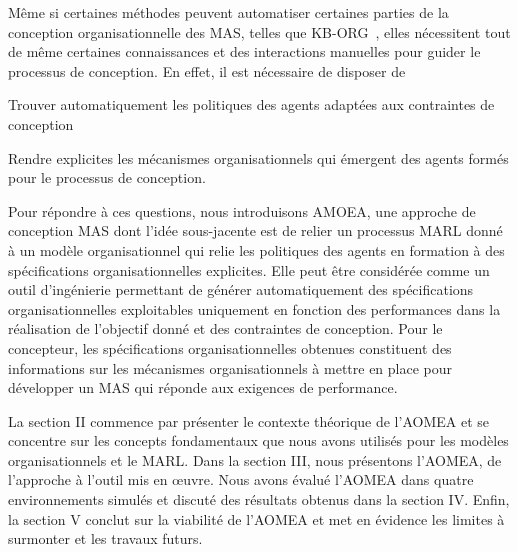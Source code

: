 Même si certaines méthodes peuvent automatiser certaines parties de la conception organisationnelle des MAS, telles que KB-ORG~\cite{Sims2008}, elles nécessitent tout de même certaines connaissances et des interactions manuelles pour guider le processus de conception. En effet, il est nécessaire de disposer de
\begin{enumerate*}[label=\roman*),itemjoin={; and \ }]
    \item Trouver automatiquement les politiques des agents adaptées aux contraintes de conception
    \item Rendre explicites les mécanismes organisationnels qui émergent des agents formés pour le processus de conception.
\end{enumerate*}


Pour répondre à ces questions, nous introduisons AMOEA, une approche de conception MAS dont l'idée sous-jacente est de relier un processus MARL donné à un modèle organisationnel qui relie les politiques des agents en formation à des spécifications organisationnelles explicites. Elle peut être considérée comme un outil d'ingénierie permettant de générer automatiquement des spécifications organisationnelles exploitables uniquement en fonction des performances dans la réalisation de l'objectif donné et des contraintes de conception. Pour le concepteur, les spécifications organisationnelles obtenues constituent des informations sur les mécanismes organisationnels à mettre en place pour développer un MAS qui réponde aux exigences de performance.



La section II commence par présenter le contexte théorique de l'AOMEA et se concentre sur les concepts fondamentaux que nous avons utilisés pour les modèles organisationnels et le MARL.
Dans la section III, nous présentons l'AOMEA, de l'approche à l'outil mis en œuvre. Nous avons évalué l'AOMEA dans quatre environnements simulés et discuté des résultats obtenus dans la section IV. Enfin, la section V conclut sur la viabilité de l'AOMEA et met en évidence les limites à surmonter et les travaux futurs.

